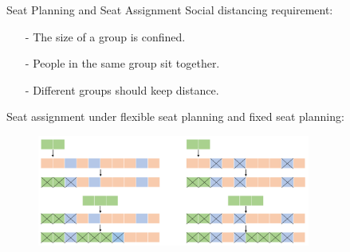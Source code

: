     \begin{frame}{Seat Planning and Seat Assignment}
      Social distancing requirement: 
      
      \begin{itemize}
        \item[-] The size of a group is confined.
        \item[-] People in the same group sit together.
        \item[-] Different groups should keep distance.
      \end{itemize}
      
      \vspace{0.5cm}

      Seat assignment under flexible seat planning and fixed seat planning:
      \begin{figure}[ht]
        \centering
        \includegraphics[width = 0.8\textwidth]{./images/assignment.png}
      \end{figure}
    
    \end{frame}
    

